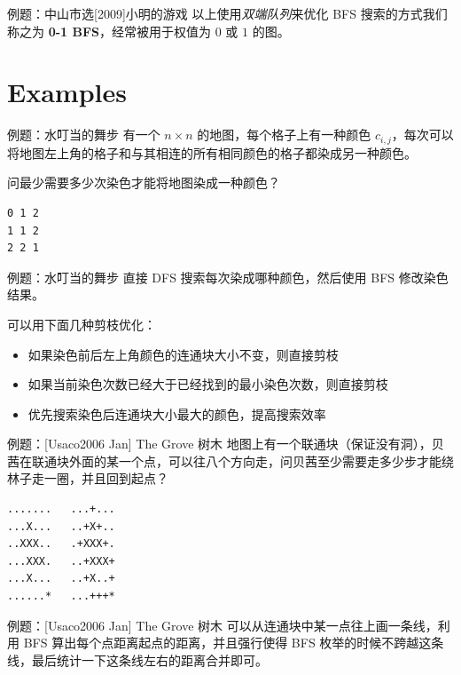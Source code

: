 \documentclass[12pt,aspectratio=169]{beamer}
\begin{document}
\begin{frame}[fragile]{例题：中山市选[2009]小明的游戏}
  以上使用\textit{双端队列}来优化 BFS 搜索的方式我们称之为 \textbf{0-1 BFS}，经常被用于权值为 $0$ 或 $1$ 的图。
\end{frame}

\section[比较有意思的例题]{Examples}

\begin{frame}[fragile]{例题：水叮当的舞步}
  有一个 $n \times n$ 的地图，每个格子上有一种颜色 $c_{i,j}$，每次可以将地图左上角的格子和与其相连的所有相同颜色的格子都染成另一种颜色。

  问最少需要多少次染色才能将地图染成一种颜色？

  \begin{verbatim}
0 1 2
1 1 2
2 2 1
  \end{verbatim}

\end{frame}

\begin{frame}[fragile]{例题：水叮当的舞步}
  直接 DFS 搜索每次染成哪种颜色，然后使用 BFS 修改染色结果。

  可以用下面几种剪枝优化：

  \begin{itemize}
    \item 如果染色前后左上角颜色的连通块大小不变，则直接剪枝
    \item 如果当前染色次数已经大于已经找到的最小染色次数，则直接剪枝
    \item 优先搜索染色后连通块大小最大的颜色，提高搜索效率
  \end{itemize}
\end{frame}

\begin{frame}[fragile]{例题：[Usaco2006 Jan] The Grove 树木}
  地图上有一个联通块（保证没有洞），贝茜在联通块外面的某一个点，可以往八个方向走，问贝茜至少需要走多少步才能绕林子走一圈，并且回到起点？

  \begin{verbatim}
.......   ...+...
...X...   ..+X+..
..XXX..   .+XXX+.
...XXX.   ..+XXX+
...X...   ..+X..+
......*   ...+++*
  \end{verbatim}
\end{frame}

\begin{frame}[fragile]{例题：[Usaco2006 Jan] The Grove 树木}
  可以从连通块中某一点往上画一条线，利用 BFS 算出每个点距离起点的距离，并且强行使得 BFS 枚举的时候不跨越这条线，最后统计一下这条线左右的距离合并即可。
\end{frame}
\end{document}
